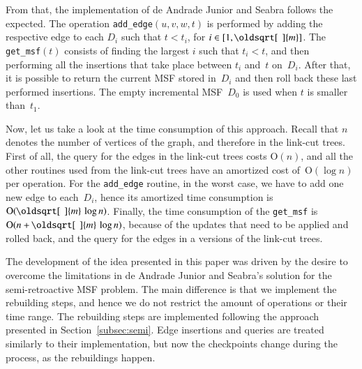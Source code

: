 \documentclass[3p,times,procedia]{elsarticle}
\renewcommand{\sqrt}[2][\mkern8mu]{\mkern-1mu\mathop{\oldsqrt[#1]{#2}}}
\newcommand{\Oh}{\mathrm{O}}
\begin{document}
From that, the implementation of de Andrade Junior and Seabra follows 
the expected.  The operation \texttt{add\_edge}$(u,v,w,t)$ is performed 
by adding the respective edge to each $D_i$ such that $t < t_i$, for
$i \in [1,\sqrt{m}]$.  The \texttt{get\_msf}$(t)$ consists of finding 
the largest $i$ such that $t_i < t$, and then performing all the 
insertions that take place between $t_i$ and~$t$ on~$D_i$.
After that, it is possible to return the current MSF stored 
in~$D_i$ and then roll back these last performed insertions.
The empty incremental MSF~$D_0$ is used when $t$ is smaller than~$t_1$.

Now, let us take a look at the time consumption of this approach.
Recall that $n$ denotes the number of vertices of the graph, 
and therefore in the link-cut trees.  First of all, the query for the edges 
in the link-cut trees costs $\Oh(n)$, and all the other routines used from 
the link-cut trees have an amortized cost of~$\Oh(\log{n})$ per operation.  
For the \texttt{add\_edge} routine, in the worst case, we have to add one new 
edge to each~$D_i$, hence its amortized time consumption is~$\Oh(\sqrt{m}\,\log{n})$. 
Finally, the time consumption of the \texttt{get\_msf} is~$\Oh(n+\sqrt{m}\,\log{n})$,
because of the updates that need to be applied and rolled back, 
and the query for the edges in a versions of the link-cut trees.

\medskip

The development of the idea presented in this paper was driven by
the desire to overcome the limitations in de Andrade 
Junior and Seabra's solution for the semi-retroactive MSF problem.  
The main difference is that we implement the rebuilding steps, 
and hence we do not restrict the amount of operations or their time range.
The rebuilding steps are implemented following 
the approach presented in Section~\ref{subsec:semi}.
Edge insertions and queries are treated similarly to their implementation, 
but now the checkpoints change during the process, as the rebuildings happen.

\medskip
\end{document}
